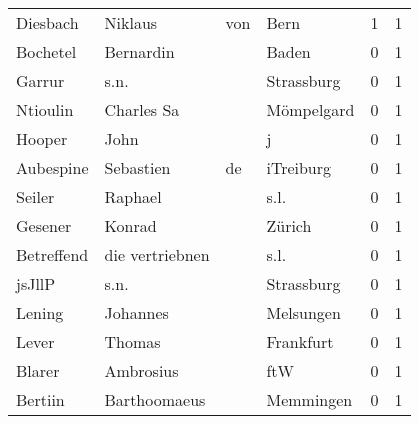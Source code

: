 \begin{tabular}{llllrr}
                 Diesbach &                            Niklaus &         von &                                        Bern &          1 &         1 \\
                 Bochetel &                          Bernardin &             &                                       Baden &          0 &         1 \\
                   Garrur &                               s.n. &             &                                  Strassburg &          0 &         1 \\
                 Ntioulin &                         Charles Sa &             &                                  Mömpelgard &          0 &         1 \\
                   Hooper &                               John &             &                                           j &          0 &         1 \\
                Aubespine &                          Sebastien &          de &                                   iTreiburg &          0 &         1 \\
                   Seiler &                            Raphael &             &                                        s.l. &          0 &         1 \\
                  Gesener &                             Konrad &             &                                      Zürich &          0 &         1 \\
               Betreffend &                    die vertriebnen &             &                                        s.l. &          0 &         1 \\
                   jsJllP &                               s.n. &             &                                  Strassburg &          0 &         1 \\
                   Lening &                           Johannes &             &                                   Melsungen &          0 &         1 \\
                    Lever &                             Thomas &             &                                   Frankfurt &          0 &         1 \\
                   Blarer &                          Ambrosius &             &                                         ftW &          0 &         1 \\
                  Bertiin &                       Barthoomaeus &             &                                   Memmingen &          0 &         1 \\

\end{tabular}
